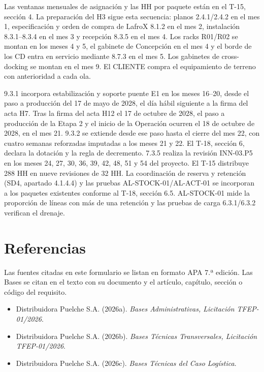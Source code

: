 Las ventanas mensuales de asignación y las HH por paquete están en el T-15, sección 4. La preparación del H3 sigue esta secuencia: planos 2.4.1/\allowbreak{}2.4.2 en el mes 1, especificación y orden de compra de LafroX 8.1.2 en el mes 2, instalación 8.3.1–8.3.4 en el mes 3 y recepción 8.3.5 en el mes 4. Los racks R01/\allowbreak{}R02 se montan en los meses 4 y 5, el gabinete de Concepción en el mes 4 y el borde de los CD entra en servicio mediante 8.7.3 en el mes 5. Los gabinetes de cross-docking se montan en el mes 9. El CLIENTE compra el equipamiento de terreno con anterioridad a cada ola.

9.3.1 incorpora estabilización y soporte puente E1 en los meses 16–20, desde el paso a producción del 17 de mayo de 2028, el día hábil siguiente a la firma del acta H7. Tras la firma del acta H12 el 17 de octubre de 2028, el paso a producción de la Etapa 2 y el inicio de la Operación ocurren el 18 de octubre de 2028, en el mes 21. 9.3.2 se extiende desde ese paso hasta el cierre del mes 22, con cuatro semanas reforzadas imputadas a los meses 21 y 22. El T-18, sección 6, declara la dotación y la regla de decremento. 7.3.5 realiza la revisión INN-03.P5 en los meses 24, 27, 30, 36, 39, 42, 48, 51 y 54 del proyecto. El T-15 distribuye 288 HH en nueve revisiones de 32 HH. La coordinación de reserva y retención (SD4, apartado 4.1.4.4) y las pruebas AL-STOCK-01/\allowbreak{}AL-ACT-01 se incorporan a los paquetes existentes conforme al T-18, sección 6.5. AL-STOCK-01 mide la proporción de líneas con más de una retención y las pruebas de carga 6.3.1/\allowbreak{}6.3.2 verifican el drenaje.

\section*{Referencias}
{}

Las fuentes citadas en este formulario se listan en formato APA 7.ª edición. Las Bases se citan en el texto con su documento y el artículo, capítulo, sección o código del requisito.

\begin{itemize}
\item Distribuidora Puelche S.A. (2026a). \emph{Bases Administrativas, Licitación TFEP-01/2026}.
\item Distribuidora Puelche S.A. (2026b). \emph{Bases Técnicas Transversales, Licitación TFEP-01/2026}.
\item Distribuidora Puelche S.A. (2026c). \emph{Bases Técnicas del Caso Logística}.

\end{itemize}
